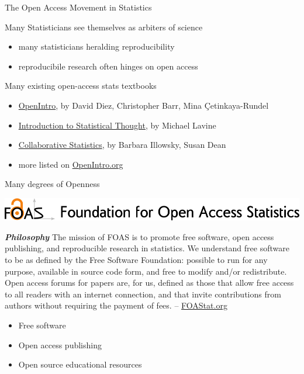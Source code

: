 
\begin{frame}{The Open Access Movement in Statistics}

\begin{block}{Many Statisticians see themselves as arbiters of science}
\begin{itemize}
\item many statisticians heralding reproducibility
\item reproducibile research often hinges on open access
\end{itemize}
\end{block}

\begin{block}{Many existing open-access stats textbooks}
\begin{itemize}
\item \href{http://www.openintro.org/stat}{OpenIntro}, by David Diez, Christopher Barr, Mina \c{C}etinkaya-Rundel
\item \href{http://www.math.umass.edu/~lavine/Book/book.html}{Introduction to Statistical Thought}, by Michael Lavine
\item \href{http://cnx.org/content/col10522/latest/}{Collaborative Statistics}, by Barbara Illowsky, Susan Dean
\item more listed on \href{http://www.openintro.org/stat/extras.php}{OpenIntro.org}
\end{itemize}
\end{block}

\end{frame}


\begin{frame}{Many degrees of Openness}

\includegraphics[width=\linewidth]{FOASLogo.png}


{\footnotesize {\bf \em Philosophy} The mission of FOAS is to promote free software, open access publishing, and reproducible research in statistics. We understand free software to be as defined by the Free Software Foundation: possible to run for any purpose, available in source code form, and free to modify and/or redistribute. Open access forums for papers are, for us, defined as those that allow free access to all readers with an internet connection, and that invite contributions from authors without requiring the payment of fees. -- \href{http://www.foastat.org}{FOAStat.org}

}


\begin{itemize}
        \item Free software
\pause
	\item Open access publishing
\pause
	\item Open source educational resources
\end{itemize}

\end{frame}


